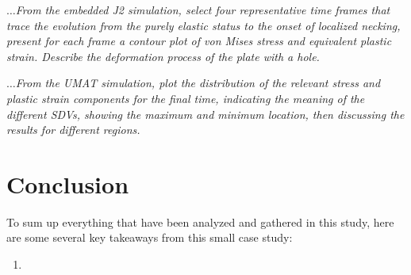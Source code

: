 \documentclass[12pt]{article}
\begin{document}
\textit{$\dots$From the embedded J2 simulation, select four representative time frames that trace the
evolution from the purely elastic status to the onset of localized necking, present for each frame
a contour plot of von Mises stress and equivalent plastic strain. Describe the deformation
process of the plate with a hole.}
\vspace{1em}

\textit{$\dots$From the UMAT simulation, plot the distribution of the relevant stress and plastic strain
components for the final time, indicating the meaning of the different SDVs, showing the
maximum and minimum location, then discussing the results for different regions.}
\vspace{1em}

\section*{Conclusion}
To sum up everything that have been analyzed and gathered in this study, 
here are some several key takeaways from this small case study:
\begin{enumerate}
    \item 
\end{enumerate}
\end{document}
